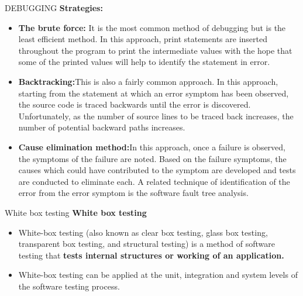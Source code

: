 \documentclass{beamer}
\begin{document}
\begin{frame}{DEBUGGING}
	\textbf{Strategies:}
\begin{itemize}
	\item \textbf{The brute force:} It is the most common method of debugging but is the least efficient method. In this approach, print statements are inserted throughout the program to print the intermediate values with the hope that some of the printed values will help to identify the statement in error. 
	\item \textbf{Backtracking:}This is also a fairly common approach. In this approach, starting from the statement at which an error symptom has been observed, the source code is traced backwards until the error is discovered. Unfortunately, as the number of source lines to be traced back increases, the number of potential backward paths increases.
	\item \textbf{Cause elimination method:}In this approach, once a failure is observed, the symptoms of the failure are noted. Based on the failure symptoms, the causes which could have contributed to the symptom are developed and tests are conducted to eliminate each. A related technique of identification of the error from the error symptom is the software fault tree analysis.
\end{itemize}
\end{frame}
\begin{frame}{White box testing}
\textbf{White box testing}
\begin{itemize}
	\item White-box testing (also known as clear box testing, glass box testing, transparent box testing, and structural testing) is a method of software testing that \textbf{tests internal structures or working of an application.}
	\item White-box testing can be applied at the unit, integration and system levels of the software testing process.
\end{itemize}
\end{frame}
\end{document}
